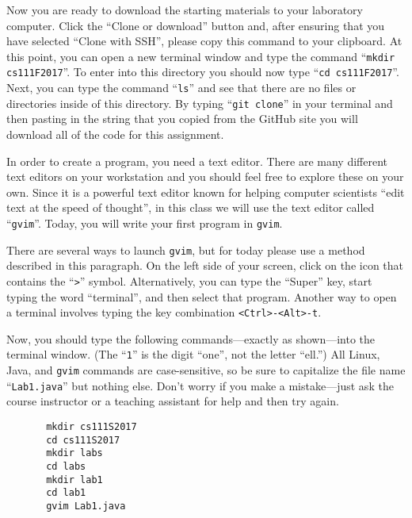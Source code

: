 \documentclass[11pt]{article}
\begin{document}
Now you are ready to download the starting materials to your laboratory computer. Click the ``Clone or download'' button
and, after ensuring that you have selected ``Clone with SSH'', please copy this command to your clipboard. At this
point, you can open a new terminal window and type the command ``{\tt mkdir cs111F2017}''. To enter into this directory
you should now type ``{\tt cd cs111F2017}''. Next, you can type the command ``{\tt ls}'' and see that there are no files
or directories inside of this directory. By typing ``{\tt git clone}'' in your terminal and then pasting in the string
that you copied from the GitHub site you will download all of the code for this assignment.

In order to create a program, you need a text editor. There are many different text editors on your workstation and
you should feel free to explore these on your own. Since it is a powerful text editor known for helping computer
scientists ``edit text at the speed of thought'', in this class we will use the text editor called ``{\tt gvim}''.
Today, you will write your first program in {\tt gvim}.

There are several ways to launch {\tt gvim}, but for today please use a method described in this paragraph.  On the
left side of your screen, click on the icon that contains the ``{\tt >}'' symbol.  Alternatively, you can type the
``Super'' key, start typing the word ``terminal'', and then select that program.  Another way to open a terminal
involves typing the key combination {\tt <Ctrl>-<Alt>-t}.


Now, you should type the following commands---exactly as shown---into the terminal window.  (The ``{\tt 1}'' is the
digit ``one'', not the letter ``ell.'') All Linux, Java, and {\tt gvim} commands are case-sensitive, so be sure to
capitalize the file name ``{\tt Lab1.java}'' but nothing else.  Don't worry if you make a mistake---just ask the course
instructor or a teaching assistant for help and then try again.

\vspace*{-.1in}
\begin{verbatim}
       mkdir cs111S2017
       cd cs111S2017
       mkdir labs
       cd labs
       mkdir lab1
       cd lab1
       gvim Lab1.java
\end{verbatim}
\vspace*{-.1in}
\end{document}
